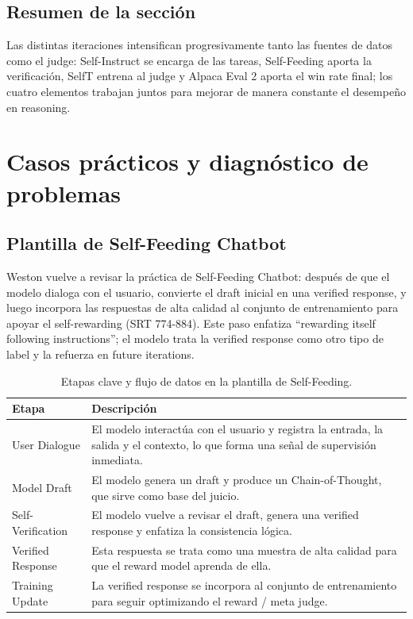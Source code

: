 \documentclass[a4paper]{article}
\begin{document}
\subsection{Resumen de la sección}
Las distintas iteraciones intensifican progresivamente tanto las fuentes de datos como el judge: Self-Instruct se encarga de las tareas, Self-Feeding aporta la verificación, SelfT entrena al judge y Alpaca Eval 2 aporta el win rate final; los cuatro elementos trabajan juntos para mejorar de manera constante el desempeño en reasoning.

\section{Casos prácticos y diagnóstico de problemas}
\subsection{Plantilla de Self-Feeding Chatbot}
Weston vuelve a revisar la práctica de Self-Feeding Chatbot: después de que el modelo dialoga con el usuario, convierte el draft inicial en una verified response, y luego incorpora las respuestas de alta calidad al conjunto de entrenamiento para apoyar el self-rewarding (SRT 774-884). Este paso enfatiza ``rewarding itself following instructions''; el modelo trata la verified response como otro tipo de label y la refuerza en future iterations.

\begin{table}[H]
\centering
\begin{tabular}{p{4cm}p{10cm}}
\toprule
Etapa & Descripción \\
\midrule
User Dialogue & El modelo interactúa con el usuario y registra la entrada, la salida y el contexto, lo que forma una señal de supervisión inmediata. \\
Model Draft & El modelo genera un draft y produce un Chain-of-Thought, que sirve como base del juicio. \\
Self-Verification & El modelo vuelve a revisar el draft, genera una verified response y enfatiza la consistencia lógica. \\
Verified Response & Esta respuesta se trata como una muestra de alta calidad para que el reward model aprenda de ella. \\
Training Update & La verified response se incorpora al conjunto de entrenamiento para seguir optimizando el reward / meta judge. \\
\bottomrule
\end{tabular}
\caption{Etapas clave y flujo de datos en la plantilla de Self-Feeding.}
\end{table}
\end{document}
